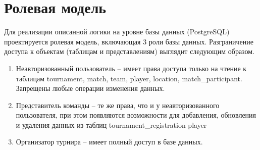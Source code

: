 	
\newpage
\section{Ролевая модель}

Для реализации описанной логики на уровне базы данных (PostgreSQL) проектируется ролевая модель, включающая 3 роли базы данных. Разграничение доступа к объектам (таблицам и представлениям) выглядит следующим образом.

\begin{enumerate}
	\item Неавторизованный пользователь -- имеет права доступа только на чтение к таблицам tournament, match, team, player, location, match\_participant. Запрещены любые операции изменения данных.
	
	\item Представитель команды -- те же права, что и у неавторизованного пользователя, при этом появляются возможности для добавления, обновления и удаления данных из таблиц tournament\_registration player
	
	\item Организатор турнира -- имеет полный доступ в базе данных.
\end{enumerate}



